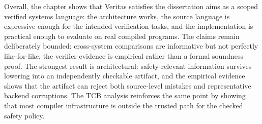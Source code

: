 Overall, the chapter shows that Veritas satisfies the dissertation aims as a scoped verified systems language: the architecture works, the source language is expressive enough for the intended verification tasks, and the implementation is practical enough to evaluate on real compiled programs. The claims remain deliberately bounded: cross-system comparisons are informative but not perfectly like-for-like, the verifier evidence is empirical rather than a formal soundness proof.
The strongest result is architectural: safety-relevant information survives lowering into an independently checkable artifact, and the empirical evidence shows that the artifact can reject both source-level mistakes and representative backend corruptions. The TCB analysis reinforces the same point by showing that most compiler infrastructure is outside the trusted path for the checked safety policy.

%
%

